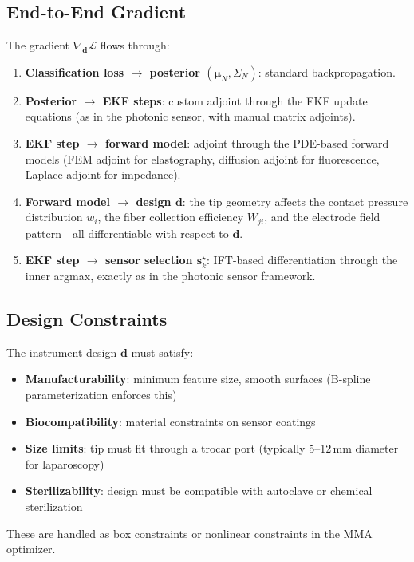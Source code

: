 \documentclass[11pt,a4paper]{article}
\theoremstyle{definition}
\begin{document}
\subsection{End-to-End Gradient}

The gradient $\nabla_{\bm{d}} \mathcal{L}$ flows through:

\begin{enumerate}[nosep]
  \item \textbf{Classification loss $\to$ posterior $(\bm{\mu}_N, \Sigma_N)$}: standard backpropagation.
  \item \textbf{Posterior $\to$ EKF steps}: custom adjoint through the EKF update equations (as in the photonic sensor, with manual matrix adjoints).
  \item \textbf{EKF step $\to$ forward model}: adjoint through the PDE-based forward models (FEM adjoint for elastography, diffusion adjoint for fluorescence, Laplace adjoint for impedance).
  \item \textbf{Forward model $\to$ design $\bm{d}$}: the tip geometry affects the contact pressure distribution $w_i$, the fiber collection efficiency $W_{ji}$, and the electrode field pattern---all differentiable with respect to $\bm{d}$.
  \item \textbf{EKF step $\to$ sensor selection $\bm{s}_k^\star$}: IFT-based differentiation through the inner argmax, exactly as in the photonic sensor framework.
\end{enumerate}

\subsection{Design Constraints}

The instrument design $\bm{d}$ must satisfy:
\begin{itemize}[nosep]
  \item \textbf{Manufacturability}: minimum feature size, smooth surfaces (B-spline parameterization enforces this)
  \item \textbf{Biocompatibility}: material constraints on sensor coatings
  \item \textbf{Size limits}: tip must fit through a trocar port (typically 5--12\,mm diameter for laparoscopy)
  \item \textbf{Sterilizability}: design must be compatible with autoclave or chemical sterilization
\end{itemize}

These are handled as box constraints or nonlinear constraints in the MMA optimizer.
\end{document}
